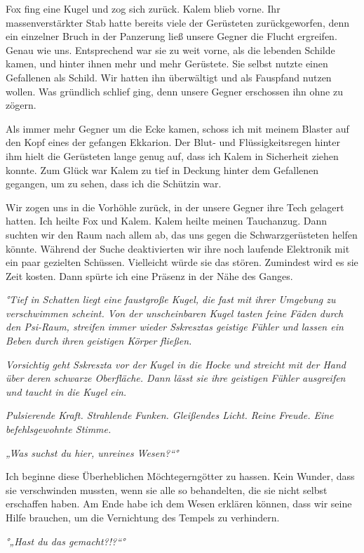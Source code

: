\documentclass[11pt]{article}
\begin{document}
Fox fing eine Kugel und zog sich zurück. Kalem blieb vorne. Ihr
massenverstärkter Stab hatte bereits viele der Gerüsteten
zurückgeworfen, denn ein einzelner Bruch in der Panzerung ließ unsere
Gegner die Flucht ergreifen. Genau wie uns. Entsprechend war sie zu weit
vorne, als die lebenden Schilde kamen, und hinter ihnen mehr und mehr
Gerüstete. Sie selbst nutzte einen Gefallenen als Schild. Wir hatten ihn
überwältigt und als Fauspfand nutzen wollen. Was gründlich schlief ging,
denn unsere Gegner erschossen ihn ohne zu zögern.

Als immer mehr Gegner um die Ecke kamen, schoss ich mit meinem Blaster
auf den Kopf eines der gefangen Ekkarion. Der Blut- und
Flüssigkeitsregen hinter ihm hielt die Gerüsteten lange genug auf, dass
ich Kalem in Sicherheit ziehen konnte. Zum Glück war Kalem zu tief in
Deckung hinter dem Gefallenen gegangen, um zu sehen, dass ich die
Schützin war.

Wir zogen uns in die Vorhöhle zurück, in der unsere Gegner ihre Tech
gelagert hatten. Ich heilte Fox und Kalem. Kalem heilte meinen
Tauchanzug. Dann suchten wir den Raum nach allem ab, das uns gegen die
Schwarzgerüsteten helfen könnte. Während der Suche deaktivierten wir
ihre noch laufende Elektronik mit ein paar gezielten Schüssen.
Vielleicht würde sie das stören. Zumindest wird es sie Zeit kosten. Dann
spürte ich eine Präsenz in der Nähe des Ganges.

\emph{°Tief in Schatten liegt eine faustgroße Kugel, die fast mit ihrer
Umgebung zu verschwimmen scheint. Von der unscheinbaren Kugel tasten
feine Fäden durch den Psi-Raum, streifen immer wieder Sskresztas
geistige Fühler und lassen ein Beben durch ihren geistigen Körper
fließen.}

\emph{Vorsichtig geht Sskreszta vor der Kugel in die Hocke und streicht
mit der Hand über deren schwarze Oberfläche. Dann lässt sie ihre
geistigen Fühler ausgreifen und taucht in die Kugel ein.}

\emph{Pulsierende Kraft. Strahlende Funken. Gleißendes Licht. Reine
Freude. Eine befehlsgewohnte Stimme.}

\emph{„Was suchst du hier, unreines Wesen?``°}

Ich beginne diese Überheblichen Möchtegerngötter zu hassen. Kein Wunder,
dass sie verschwinden mussten, wenn sie alle so behandelten, die sie
nicht selbst erschaffen haben. Am Ende habe ich dem Wesen erklären
können, dass wir seine Hilfe brauchen, um die Vernichtung des Tempels zu
verhindern.

\emph{°„Hast du das gemacht?!?``°}
\end{document}
